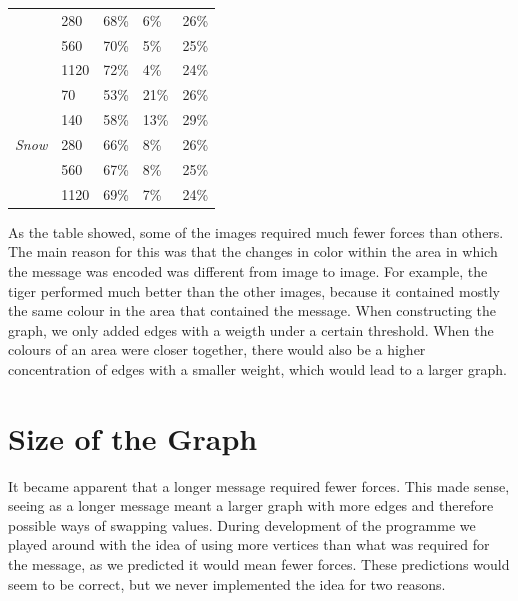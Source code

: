 \begin{table}[H]
{\begin{tabular}{@{}lllll@{}}
                                                & 280                     & 68\%           & 6\%             & 26\%                 \\
                                                & 560                     & 70\%           & 5\%             & 25\%                 \\
                                                & 1120                    & 72\%           & 4\%             & 24\%                 \\ \midrule
            \multirow{5}{*}{\textit{Snow}}      & 70                      & 53\%           & 21\%            & 26\%                 \\
                                                & 140                     & 58\%           & 13\%            & 29\%                 \\
                                                & 280                     & 66\%           & 8\%             & 26\%                 \\
                                                & 560                     & 67\%           & 8\%             & 25\%                 \\
                                                & 1120                    & 69\%           & 7\%             & 24\%                 \\ \bottomrule
        \end{tabular}
    }
\end{table}

As the table showed, some of the images required much fewer forces than others.
The main reason for this was that the changes in color within the area in which the message was encoded was different from image to image.
For example, the tiger performed much better than the other images, because it contained mostly the same colour in the area that contained the message.
When constructing the graph, we only added edges with a weigth under a certain threshold.
When the colours of an area were closer together, there would also be a higher concentration of edges with a smaller weight, which would lead to a larger graph.

\section{Size of the Graph}
It became apparent that a longer message required fewer forces. 
This made sense, seeing as a longer message meant a larger graph with more edges and therefore possible ways of swapping values.
During development of the programme we played around with the idea of using more vertices than what was required for the message, as we predicted it would mean fewer forces.
These predictions would seem to be correct, but we never implemented the idea for two reasons.

